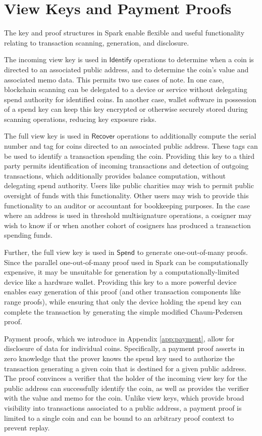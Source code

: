 \documentclass{llncs}
\newcommand{\func}[1]{\mathsf{#1}}
\begin{document}
\section{View Keys and Payment Proofs}

The key and proof structures in Spark enable flexible and useful functionality relating to transaction scanning, generation, and disclosure.

The incoming view key is used in $\func{Identify}$ operations to determine when a coin is directed to an associated public address, and to determine the coin's value and associated memo data.
This permits two use cases of note.
In one case, blockchain scanning can be delegated to a device or service without delegating spend authority for identified coins.
In another case, wallet software in possession of a spend key can keep this key encrypted or otherwise securely stored during scanning operations, reducing key exposure risks.

The full view key is used in $\func{Recover}$ operations to additionally compute the serial number and tag for coins directed to an associated public address.
These tags can be used to identify a transaction spending the coin.
Providing this key to a third party permits identification of incoming transactions and detection of outgoing transactions, which additionally provides balance computation, without delegating spend authority.
Users like public charities may wish to permit public oversight of funds with this functionality.
Other users may wish to provide this functionality to an auditor or accountant for bookkeeping purposes.
In the case where an address is used in threshold multisignature operations, a cosigner may wish to know if or when another cohort of cosigners has produced a transaction spending funds.

Further, the full view key is used in $\func{Spend}$ to generate one-out-of-many proofs.
Since the parallel one-out-of-many proof used in Spark can be computationally expensive, it may be unsuitable for generation by a computationally-limited device like a hardware wallet.
Providing this key to a more powerful device enables easy generation of this proof (and other transaction components like range proofs), while ensuring that only the device holding the spend key can complete the transaction by generating the simple modified Chaum-Pedersen proof.

Payment proofs, which we introduce in Appendix \ref{app:payment}, allow for disclosure of data for individual coins.
Specifically, a payment proof asserts in zero knowledge that the prover knows the spend key used to authorize the transaction generating a given coin that is destined for a given public address.
The proof convinces a verifier that the holder of the incoming view key for the public address can successfully identify the coin, as well as provides the verifier with the value and memo for the coin.
Unlike view keys, which provide broad visibility into transactions associated to a public address, a payment proof is limited to a single coin and can be bound to an arbitrary proof context to prevent replay.
\end{document}
